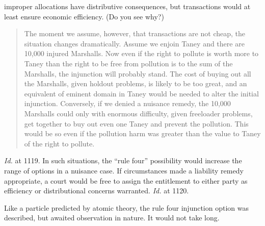 improper allocations have distributive consequences, but transactions would at
least ensure economic efficiency. (Do you see why?) 
\begin{quote}
The moment we assume, however, that transactions are not cheap, the situation
changes dramatically. Assume we enjoin Taney and there are 10,000 injured
Marshalls. Now even if the right to pollute is worth more to Taney than the
right to be free from pollution is to the sum of the Marshalls, the injunction
will probably stand. The cost of buying out all the Marshalls, given holdout
problems, is likely to be too great, and an equivalent of eminent domain in
Taney would be needed to alter the initial injunction. Conversely, if we denied
a nuisance remedy, the 10,000 Marshalls could only with enormous difficulty,
given freeloader problems, get together to buy out even one Taney and prevent
the pollution. This would be so even if the pollution harm was greater than the
value to Taney of the right to pollute.
\end{quote}
\textit{Id.} at 1119. In such situations, the ``rule four'' possibility would
increase the range of options in a nuisance case. If circumstances made a
liability remedy appropriate, a court would be free to assign the entitlement to
either party as efficiency or distributional concerns warranted. \textit{Id.} at
1120. 

Like a particle predicted by atomic theory, the rule four injunction option was
described, but awaited observation in nature. It would not take long.

